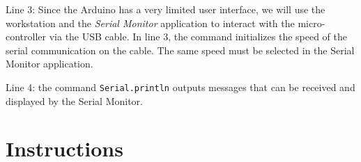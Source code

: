 \documentclass[12pt]{book}
\begin{document}


\begin{compactitem}[--]
  \item Line 3: Since the Arduino has a very limited user interface,
    we will use the workstation and the \emph{Serial Monitor}
    application to interact with the micro-controller via the USB
    cable. In line 3, the command initializes the speed of the serial
    communication on the cable. The same speed must be selected in the
    Serial Monitor application.

    \item Line 4: the command
      \texttt{Serial.println} outputs messages that can be received
      and displayed by the Serial Monitor.
\end{compactitem}


\section{Instructions}
\end{document}

